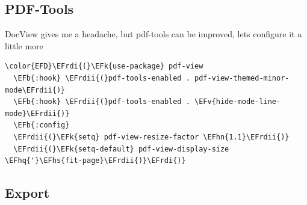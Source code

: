 \documentclass{scrartcl}
\newcommand{\EFk}[1]{\textcolor{EFk}{#1}} %
\newcommand{\EFb}[1]{\textcolor{EFb}{#1}} %
\newcommand{\EFv}[1]{\textcolor{EFv}{#1}} %
\newcommand{\EFhn}[1]{#1} %
\newcommand{\EFhq}[1]{#1} %
\newcommand{\EFhs}[1]{#1} %
\newcommand{\EFrdi}[1]{#1} %
\newcommand{\EFrdii}[1]{#1} %
\begin{document}
\subsection{PDF-Tools}
\label{sec:org80011ac}
DocView gives me a headache, but pdf-tools can be improved, lets configure it a little more
\begin{Code}
\begin{Verbatim}[]
\color{EFD}\EFrdi{(}\EFk{use-package} pdf-view
  \EFb{:hook} \EFrdii{(}pdf-tools-enabled . pdf-view-themed-minor-mode\EFrdii{)}
  \EFb{:hook} \EFrdii{(}pdf-tools-enabled . \EFv{hide-mode-line-mode}\EFrdii{)}
  \EFb{:config}
  \EFrdii{(}\EFk{setq} pdf-view-resize-factor \EFhn{1.1}\EFrdii{)}
  \EFrdii{(}\EFk{setq-default} pdf-view-display-size \EFhq{'}\EFhs{fit-page}\EFrdii{)}\EFrdi{)}
\end{Verbatim}
\end{Code}

\subsection{Export}
\label{sec:org40dff03}
\end{document}
